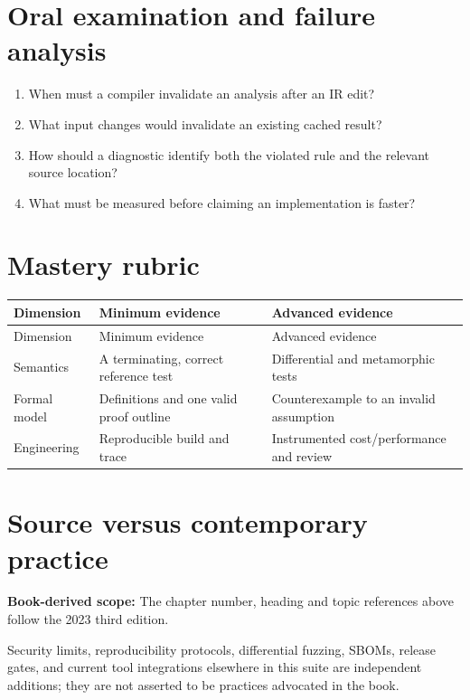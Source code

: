 \documentclass[10pt,letterpaper]{article}
\begin{document}
\section{Oral examination and failure analysis}
\begin{enumerate}
\item When must a compiler invalidate an analysis after an IR edit?
\item What input changes would invalidate an existing cached result?
\item How should a diagnostic identify both the violated rule and the relevant source location?
\item What must be measured before claiming an implementation is faster?
\end{enumerate}

\section{Mastery rubric}
\begin{longtable}{|>{\raggedright\arraybackslash}p{}|>{\raggedright\arraybackslash}p{}|>{\raggedright\arraybackslash}p{}|}
\hline
Dimension & Minimum evidence & Advanced evidence\\ \hline\endfirsthead
\hline
Dimension & Minimum evidence & Advanced evidence\\ \hline\endhead
Semantics & A terminating, correct reference test & Differential and metamorphic tests\\ \hline
Formal model & Definitions and one valid proof outline & Counterexample to an invalid assumption\\ \hline
Engineering & Reproducible build and trace & Instrumented cost/performance and review\\ \hline
\end{longtable}

\section{Source versus contemporary practice}
\textbf{Book-derived scope:} The chapter number, heading and topic references above follow the 2023 third edition.\par\modern Security limits, reproducibility protocols, differential fuzzing, SBOMs, release gates, and current tool integrations elsewhere in this suite are independent additions; they are not asserted to be practices advocated in the book.
\end{document}
